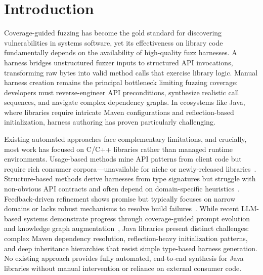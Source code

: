 \documentclass[sigconf,review,anonymous]{acmart}
\begin{document}



\maketitle

\section{Introduction}

Coverage-guided fuzzing has become the gold standard for discovering vulnerabilities in systems software, yet its effectiveness on library code fundamentally depends on the availability of high-quality fuzz harnesses. A harness bridges unstructured fuzzer inputs to structured API invocations, transforming raw bytes into valid method calls that exercise library logic. Manual harness creation remains the principal bottleneck limiting fuzzing coverage: developers must reverse-engineer API preconditions, synthesize realistic call sequences, and navigate complex dependency graphs. In ecosystems like Java, where libraries require intricate Maven configurations and reflection-based initialization, harness authoring has proven particularly challenging.

Existing automated approaches face complementary limitations, and crucially, most work has focused on C/C++ libraries rather than managed runtime environments. Usage-based methods mine API patterns from client code but require rich consumer corpora—unavailable for niche or newly-released libraries~\cite{DBLP:conf/sigsoft/BabicBCIKKLSW19:FUDGE,DBLP:conf/sp/JeongJYMKJKSH23:UTopia}. Structure-based methods derive harnesses from type signatures but struggle with non-obvious API contracts and often depend on domain-specific heuristics~\cite{DBLP:conf/icse/GreenA22:GraphFuzz,DBLP:conf/icse/ShermanN25:OGHarn}. Feedback-driven refinement shows promise but typically focuses on narrow domains or lacks robust mechanisms to resolve build failures~\cite{DBLP:conf/uss:ZhangLZZZZXLL0H23:Rubick}. While recent LLM-based systems demonstrate progress through coverage-guided prompt evolution~\cite{DBLP:conf/ccs/LyuXCC24:PromptFuzz} and knowledge graph augmentation~\cite{DBLP:conf/icse:XuMZZCHLW25:CKGFuzzer}, Java libraries present distinct challenges: complex Maven dependency resolution, reflection-heavy initialization patterns, and deep inheritance hierarchies that resist simple type-based harness generation. No existing approach provides fully automated, end-to-end synthesis for Java libraries without manual intervention or reliance on external consumer code.
\end{document}
